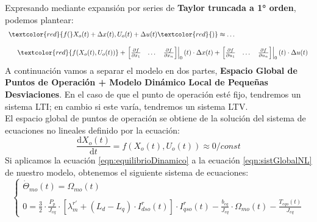 \documentclass[10pt]{article}
\begin{document}
\begin{enumerate}
	Expresando mediante expansión por series de \textbf{Taylor truncada a 1° orden}, podemos plantear:
	\begin{equation}
		\begin{array}{l}
			\textcolor{red}{f(} X_{o}(t)+\Delta x(t),U_{o}(t)+\Delta u(t) \textcolor{red}{)} \approx \dots
			\\
			\\
			\ \ \ \ 
			\textcolor{red}{f( X_{o}(t),U_{o}(t) )}+
			\left.\begin{matrix}
				\begin{bmatrix}
					\frac{\partial f}{\partial x_{1}} & \dots & \frac{\partial f}{\partial x_{n}}
				\end{bmatrix}
			\end{matrix}\right|_{0}(t)\cdot \Delta x(t)+
			\left.\begin{matrix}
				\begin{bmatrix}
					\frac{\partial f}{\partial u_{1}} & \dots & \frac{\partial f}{\partial u_{n}}
				\end{bmatrix}
			\end{matrix}\right|_{0}(t)\cdot \Delta u(t)
		\end{array}
	\end{equation}
	A continuación vamos a separar el modelo en dos partes, \textbf{Espacio Global de Puntos de Operación + Modelo Dinámico Local de Pequeñas Desviaciones}.
	En el caso de que el punto de operación esté fijo, tendremos un sistema LTI; en cambio si este varía, tendremos un sistema LTV.
	\\
	El espacio global de puntos de operación se obtiene de la solución del sistema de ecuaciones no lineales definido por la ecuación:
	\begin{equation}
		\label{eqn:equilibrioDinamico}
		\frac{\mathrm{d} X_{o}(t)}{\mathrm{d} t}=f(X_{o}(t),U_{o}(t))\approx 0/const
	\end{equation}
	Si aplicamos la ecuación \ref{eqn:equilibrioDinamico} a la ecuación \ref{eqn:sistGlobalNL} de nuestro modelo, obtenemos el siguiente sistema de ecuaciones:
	\begin{equation}
		\label{eqn:equilibrioDinamicoSistema}
		\begin{cases}
			\dot{\Theta}_{mo}(t)=\Omega_{mo}(t)
			\\
			\\
			0=\frac{3}{2} \cdot \frac{ P_{p}}{J_{eq}}\cdot \left [ \lambda_{m}^{r'}+\left ( L_{d}-L_{q} \right )\cdot I_{dso}^{r} \left ( t \right ) \right ] \cdot I_{qso}^{r}\left ( t \right )-\frac{b_{eq}}{J_{eq}}\cdot \Omega_{mo}\left ( t \right )-\frac{T_{eqo}(t)}{J_{eq}}

\end{cases}
\end{equation}
\end{enumerate}
\end{document}
